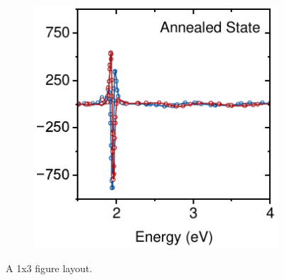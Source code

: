 \begin{figure}[htbp]
\begin{subfigure}{0.31\textwidth}
        \caption{}
        \label{fig:ellipsometry:deriv:300}
    \end{subfigure}
    \hfill
    \begin{subfigure}{0.31\textwidth}
        \includegraphics[width=\textwidth]{chapters/ellipsometry/image/Deriv_Anneal.pdf}
        \caption{}
        \label{fig:ellipsometry:deriv:anneal}
    \end{subfigure}
    \caption{A 1x3 figure layout.}
    \label{fig:ellipsometry:deriv}
\end{figure}

